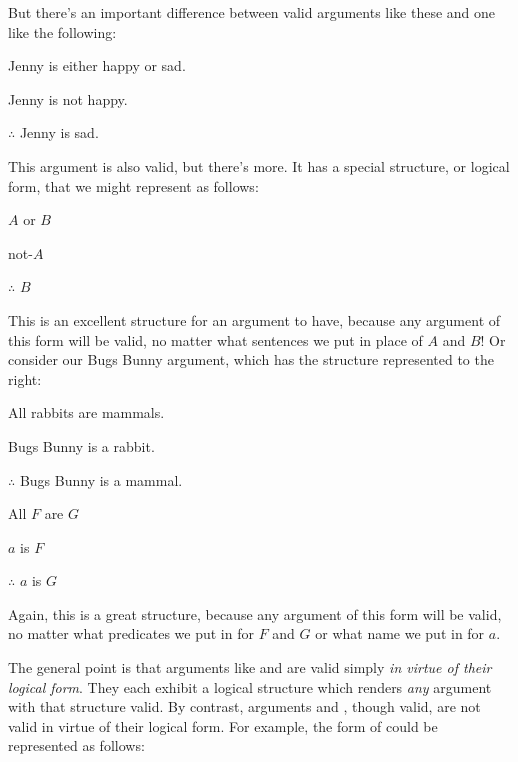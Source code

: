 But there's an important difference between valid arguments like these and one like the following:

	\begin{earg}
		\item[\ex{exarg8}] Jenny is either happy or sad.
		\item[] Jenny is not happy.
		\item[] $\therefore$ Jenny is sad.
	\end{earg}

\noindent This argument is also valid, but there's more.  It has a special structure, or logical form, that we might represent as follows:


	\begin{earg}
		\item[] $A$ or $B$
		\item[] not-$A$
		\item[] $\therefore$ $B$
	\end{earg}

\noindent This is an excellent structure for an argument to have, because any argument of this form will be valid, no matter what sentences we put in place of $A$ and $B$! Or consider our Bugs Bunny argument, which has the structure represented to the right:



\begin{multicols}{2}
	
\begin{earg}
\item[\eref{exarg1}]All rabbits are mammals.
\item[] Bugs Bunny is a rabbit.
\item[] $\therefore$ Bugs Bunny is a mammal.
\end{earg}
	
\columnbreak

\begin{earg}
	\item[] All $F$ are $G$
	\item[] $a$ is $F$
	\item[] $\therefore$ $a$ is $G$
\end{earg}

\end{multicols}


\noindent Again, this is a great structure, because any argument of this form will be valid, no matter what predicates we put in for $F$ and $G$ or what name we put in for $a$.


The general point is that arguments like  and   are valid simply \emph{in virtue of their logical form}.  They each exhibit a logical structure which renders \emph{any} argument with that structure valid.  By contrast, arguments   and , though valid, are not valid in virtue of their logical form.  For example, the form of  could be represented as follows:

